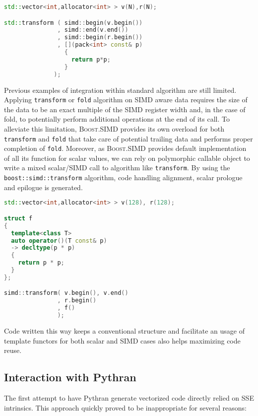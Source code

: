 \documentclass[preprint]{sigplanconf}
\providecommand{\boostsimd}{\textsc{Boost.SIMD}}
\begin{document}
\begin{lstlisting}[language=c++, label={lst:square-cxx}, caption={SIMD Iterator with STL algorithm},label=stl_example]
std::vector<int,allocator<int> > v(N),r(N);

std::transform ( simd::begin(v.begin())
               , simd::end(v.end())
               , simd::begin(r.begin())
               , [](pack<int> const& p)
                 { 
                   return p*p; 
                 } 
              );
\end{lstlisting}

Previous examples of integration within standard algorithm are still limited.
Applying \texttt{transform} or \texttt{fold} algorithm on SIMD aware data
requires the size of the data to be an exact multiple of the SIMD register width
and, in the case of fold, to potentially perform additional operations at the
end of its call. To alleviate this limitation, \boostsimd{}
provides its own overload for both \texttt{transform} and \texttt{fold} that take
care of potential trailing data and performs proper completion of \texttt{fold}.
Moreover, as \boostsimd{} provides default implementation of all its function for scalar values,
we can rely on polymorphic callable object to write a mixed scalar/SIMD call to algorithm
like \texttt{transform}. By using the \texttt{boost::simd::transform} algorithm, code
handling alignment, scalar prologue and epilogue is generated.

\begin{lstlisting}[language=c++, label={lst:square-cxx}, caption={Polymorphic SIMD algorithm call},label=stl_poly]
std::vector<int,allocator<int> > v(128), r(128);

struct f
{
  template<class T>
  auto operator()(T const& p)
  -> decltype(p * p)
  {
    return p * p;
  }
};

simd::transform( v.begin(), v.end()
               , r.begin()
               , f() 
               );
\end{lstlisting}


Code written this way keeps a conventional structure and facilitate an usage of template
functors for both scalar and SIMD cases also helps maximizing code reuse.

\subsection{Interaction with Pythran}

The first attempt to have Pythran generate vectorized code directly relied on
SSE intrinsics. This approach quickly proved to be inappropriate for several
reasons:
\end{document}
